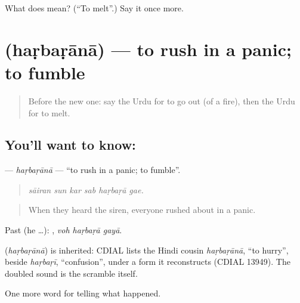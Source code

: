 \begin{tcolorbox}[breakable,colback=teal!4,colframe=teal!35!black,title={Before you move on}]
What does  mean? (\textquotedblleft{}To melt\textquotedblright{}.) Say it once more.
\end{tcolorbox}
\section[\texorpdfstring{\ur{ہڑبڑانا} (haṛbaṛānā)}{ہڑبڑانا (haṛbaṛānā)}]{ (haṛbaṛānā) — to rush in a panic; to fumble}

\label{lesson:UR-C289-harbarana}



\begin{quote}
Before the new one: say the Urdu for to go out (of a fire), then the Urdu for to melt.
\end{quote}

\subsection*{You'll want to know: }
\textbf{} — \emph{haṛbaṛānā} — \textquotedblleft{}to rush in a panic; to fumble\textquotedblright{}.

\begin{quote}
     
\end{quote}

\begin{quote}
\emph{sāiran sun kar sab haṛbaṛā gae.}
\end{quote}

\begin{quote}
When they heard the siren, everyone rushed about in a panic.
\end{quote}

Past (he …):   , \emph{voh haṛbaṛā gayā}.

\begin{cousinweb}
\textbf{} (\emph{haṛbaṛānā}) is inherited: CDIAL lists the Hindi cousin \emph{haṛbaṛānā}, \textquotedblleft{}to hurry\textquotedblright{}, beside \emph{haṛbaṛī}, \textquotedblleft{}confusion\textquotedblright{}, under a form it reconstructs (CDIAL 13949). The doubled sound is the scramble itself.
\end{cousinweb}

\begin{grammarlens}[title={What you've built}]
One more word for telling what happened.
\end{grammarlens}

